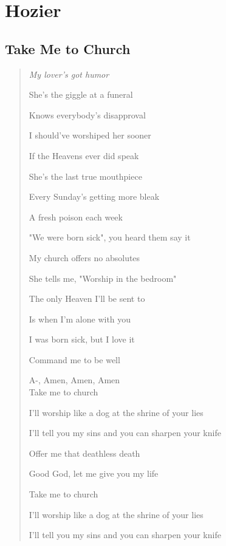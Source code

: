 \documentclass{book}
\numberwithin{equation}{section}
\begin{document}

\chapter{Hozier}

\section{Take Me to Church}

\begin{quotation}\it
    My lover's got humor
    
    She's the giggle at a funeral
    
    Knows everybody's disapproval
    
    I should've worshiped her sooner
    
    If the Heavens ever did speak
    
    She's the last true mouthpiece
    
    Every Sunday's getting more bleak
    
    A fresh poison each week
    
    "We were born sick", you heard them say it
    
    My church offers no absolutes
    
    She tells me, "Worship in the bedroom"
    
    The only Heaven I'll be sent to
    
    Is when I'm alone with you
    
    I was born sick, but I love it
    
    Command me to be well
    
    A-, Amen, Amen, Amen
    \\
    
    Take me to church
    
    I'll worship like a dog at the shrine of your lies
    
    I'll tell you my sins and you can sharpen your knife
    
    Offer me that deathless death
    
    Good God, let me give you my life
    
    Take me to church
    
    I'll worship like a dog at the shrine of your lies
    
    I'll tell you my sins and you can sharpen your knife
    

\end{quotation}
\end{document}
